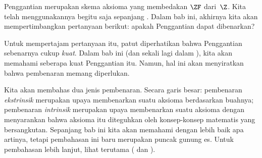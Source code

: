 \documentclass[../../../include/open-logic-section]{subfiles}
\begin{document}

Penggantian merupakan skema aksioma yang membedakan $\ZF$ dari~$\Z$. Kita
telah menggunakannya begitu saja sepanjang
. Dalam bab ini, akhirnya kita
akan mempertimbangkan pertanyaan berikut: apakah Penggantian dapat
dibenarkan?

Untuk mempertajam pertanyaan itu, patut diperhatikan bahwa Penggantian
sebenarnya cukup \emph{kuat}. Dalam bab ini (dan sekali lagi dalam
), kita akan memahami seberapa kuat
Penggantian itu. Namun, hal ini akan menyiratkan bahwa pembenaran memang
diperlukan.

Kita akan membahas dua jenis pembenaran. Secara garis besar: pembenaran
\emph{ekstrinsik} merupakan upaya membenarkan suatu aksioma berdasarkan
buahnya; pembenaran \emph{intrinsik} merupakan upaya membenarkan suatu
aksioma dengan menyarankan bahwa aksioma itu diteguhkan oleh konsep-konsep
matematis yang bersangkutan. Sepanjang bab ini kita akan memahami dengan
lebih baik apa artinya, tetapi pembahasan ini baru merupakan puncak gunung
es. Untuk pembahasan lebih lanjut, lihat terutama \citeauthor{Maddy1988a}
(\citeyear{Maddy1988a} dan \citeyear{Maddy1988b}).
\end{document}
